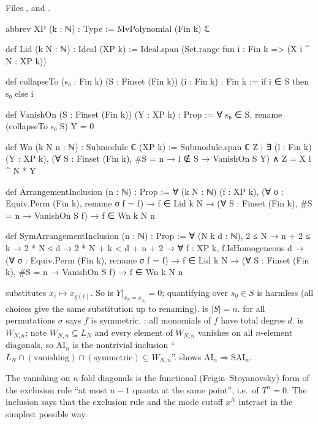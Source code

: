 \noindent Files ,
 and
.
\begin{leancode}
abbrev XP (k : ℕ) : Type := MvPolynomial (Fin k) ℂ

def Lid (k N : ℕ) : Ideal (XP k) := Ideal.span (Set.range fun i : Fin k => (X i ^ N : XP k))

def collapseTo (s₀ : Fin k) (S : Finset (Fin k)) (i : Fin k) : Fin k := if i ∈ S then s₀ else i

def VanishOn (S : Finset (Fin k)) (Y : XP k) : Prop := ∀ s₀ ∈ S, rename (collapseTo s₀ S) Y = 0

def Wn (k N n : ℕ) : Submodule ℂ (XP k) :=
  Submodule.span ℂ {Z | ∃ (l : Fin k) (Y : XP k),
    (∀ S : Finset (Fin k), #S = n → l ∉ S → VanishOn S Y) ∧ Z = X l ^ N * Y}

def ArrangementInclusion (n : ℕ) : Prop :=
  ∀ (k N : ℕ) (f : XP k), (∀ σ : Equiv.Perm (Fin k), rename σ f = f) → f ∈ Lid k N →
    (∀ S : Finset (Fin k), #S = n → VanishOn S f) → f ∈ Wn k N n

def SymArrangementInclusion (n : ℕ) : Prop :=
  ∀ (N k d : ℕ), 2 ≤ N → n + 2 ≤ k → 2 * N ≤ d → 2 * N + k < d + n + 2 →
    ∀ f : XP k, f.IsHomogeneous d → (∀ σ : Equiv.Perm (Fin k), rename σ f = f) →
      f ∈ Lid k N → (∀ S : Finset (Fin k), #S = n → VanishOn S f) → f ∈ Wn k N n
\end{leancode}

\begin{dictionary}
 substitutes $x_i\mapsto x_{g(i)}$. So  is $Y|_{x_S=x_{s_0}}=0$;
quantifying over $s_0\in S$ is harmless (all choices give the same substitution up to renaming).  is
$|S|=n$.  for all permutations $\sigma$ says $f$ is symmetric. : all
monomials of $f$ have total degree $d$.  is $W_{N,n}$; note $W_{N,n}\subseteq L_N$ and every element of
$W_{N,n}$ vanishes on all $n$-element diagonals, so $\mathrm{AI}_n$ is the nontrivial inclusion
``$L_N\cap(\text{vanishing})\cap(\text{symmetric})\subseteq W_{N,n}$''. 
shows $\mathrm{AI}_n\Rightarrow\mathrm{SAI}_n$.
\end{dictionary}

\begin{physics}
The vanishing on $n$-fold diagonals is the functional (Feigin--Stoyanovsky) form of the exclusion rule ``at most $n-1$
quanta at the same point'', i.e.\ of $T^n=0$. The inclusion says that the exclusion rule and the mode cutoff
$x^N$ interact in the simplest possible way.
\end{physics}

